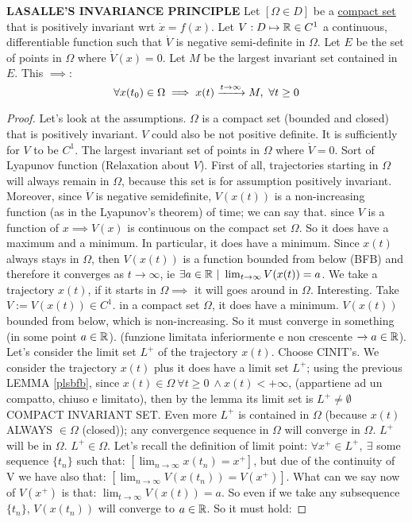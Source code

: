 \begin{thrm}{\textbf{LASALLE'S INVARIANCE PRINCIPLE}} \newline
Let $[\Omega \in D]$ be a \underline{compact set} that is positively invariant wrt $\dot{x}=f(x)$. Let $V:D \mapsto \mathbb{R} \in C^1$ a continuous, differentiable function such that $\dot{V}$ is negative semi-definite in $\Omega$. Let $E$ be the set of points in $\Omega$ where $\dot{V}(x) = 0$. Let $M$ be the largest invariant set contained in $E$. This $\implies$:
\[
	\forall x(t_0) \in \Omega \implies x(t) \tendsto{t\to\infty} M,\ \forall t \geq 0
\]
\end{thrm}

\begin{proof}
Let's look at the assumptions. $\Omega$ is a compact set (bounded and closed) that is positively invariant. $V$ could also be not positive definite. It is sufficiently for $V$ to be $C^1$. The largest invariant set of points in $\Omega$ where $\dot{V}=0$. Sort of Lyapunov function (Relaxation about $V$). First of all, trajectories starting in $\Omega$ will always remain in $\Omega$, because this set is for assumption positively invariant. Moreover, since $\dot{V}$ is negative semidefinite, $V(x(t))$ is a non-increasing function (as in the Lyapunov's theorem) of time; we can say that. since $V$ is a function of $x \implies V(x)$ is continuous on the compact set $\Omega$. So it does have a maximum and a minimum. In particular, it does have a minimum. Since $x(t)$ always stays in $\Omega$, then $V(x(t))$ is a function bounded from below (BFB) and therefore it converges as $t\to \infty$, ie $\exists a \in \R\ |\ \lim_{t\to\infty}{V(x(t))}=a$. We take a trajectory $x(t)$, if it starts in $\Omega \implies$ it will goes around in $\Omega$. Interesting. Take $V := V(x(t)) \in C^1$. in a compact set $\Omega$, it does have a minimum. $V(x(t))$ bounded from below, which is non-increasing. So it must converge in something (in some point $a \in \mathbb{R}$). (funzione limitata inferiormente e non crescente $\tendsto{} a \in \R$).
Let's consider the limit set $L^+$ of the trajectory $x(t)$. Choose CINIT's. We consider the trajectory $x(t)$ plus it does have a limit set $L^+$; using the previous LEMMA \ref{plsbfb}, since $x(t) \in \Omega\ \forall t \geq 0\ \land x(t) < +\infty$, (appartiene ad un compatto, chiuso e limitato), then by the lemma its limit set is $L^+ \neq \emptyset$ COMPACT INVARIANT SET. Even more $L^+$ is contained in $\Omega$ (because $x(t)$ ALWAYS $\in \Omega$ (closed)); any convergence sequence in $\Omega$ will converge in $\Omega$. $L^+$ will be in $\Omega$. $L^+ \in \Omega$. Let's recall the definition of limit point: $\forall x^+ \in L^+,\ \exists$ some sequence $\{t_n\}$ such that: $[\lim_{n\to\infty}{x(t_n)} = x^+]$, but due of the continuity of V we have also that: $[\lim_{n\to\infty}{V(x(t_n))} = V(x^+)]$. What can we say now of $V(x^+)$ is that: $\lim_{t\to\infty}{V(x(t))} = a$. So even if we take any subsequence $\{t_n\}$, $V(x(t_n))$ will converge to $a \in \mathbb{R}$. So it must hold:

\end{proof}
